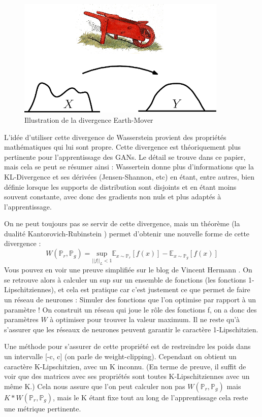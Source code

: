 \begin{figure}[ht!]
  \centering
    \includegraphics[width=10cm]{fig/Earth_mover_distance}
    \caption{Illustration de la divergence Earth-Mover}
    \label{fig:E-M_distance}
\end{figure}


L'idée d'utiliser cette divergence de Wasserstein provient des propriétés mathématiques qui lui sont propre. Cette divergence est théoriquement plus pertinente pour l'apprentissage des GANs. Le détail se trouve dans ce papier, mais cela se peut se résumer ainsi : Wassertein donne plus d'informations que la KL-Divergence et ses dérivées (Jensen-Shannon, etc) en étant, entre autres, bien définie lorsque les supports de distribution sont disjoints et en étant moins souvent constante, avec donc des gradients non nuls et plus adaptés à l'apprentissage.

On ne peut toujours pas se servir de cette divergence, mais un théorème (la dualité Kantorovich-Rubinstein \cite{optimal-transport}) permet d'obtenir une nouvelle forme de cette divergence :
\[
W(\mathbb{P}_r, \mathbb{P}_g) = \underset{||f||_L<1}{\text{sup}}\mathbb{E}_{x\sim\mathbb{P}_r}\left[f(x)\right] - \mathbb{E}_{x\sim\mathbb{P}_g}\left[f(x)\right]
\]
Vous pouvez en voir une preuve simplifiée sur le blog de Vincent Hermann \cite{preuve-wgan}.
On se retrouve alors à calculer un sup sur un ensemble de fonctions (les fonctions 1-Lipschitziennes), et cela est pratique car c'est justement ce que permet de faire un réseau de neurones : Simuler des fonctions que l'on optimise par rapport à un paramètre ! On construit un réseau qui joue le rôle des fonctions f, on a donc des paramètres $W$ à optimiser pour trouver la valeur maximum. Il ne reste qu'à s'assurer que les réseaux de neurones peuvent garantir le caractère 1-Lipschitzien.

Une méthode pour s'assurer de cette propriété est de restreindre les poids dans un intervalle [-c, c] (on parle de weight-clipping). Cependant on obtient un caractère K-Lipschitzien, avec un K inconnu. (En terme de preuve, il suffit de voir que des matrices avec ses propriétés sont toutes K-Lipschitziennes avec un même K.) Cela nous assure que l'on peut calculer non pas $W(\mathbb{P}_r, \mathbb{P}_g)$ mais $K*W(\mathbb{P}_r, \mathbb{P}_g)$, mais le K étant fixe tout au long de l'apprentissage cela reste une métrique pertinente. 

